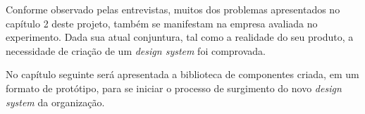 Conforme observado pelas entrevistas, muitos dos problemas apresentados no capítulo 2 deste projeto, também se manifestam na empresa avaliada no experimento. Dada sua atual conjuntura, tal como a realidade do seu produto, a necessidade de criação de um \textit{design system} foi comprovada.

No capítulo seguinte será apresentada a biblioteca de componentes criada, em um formato de protótipo, para se iniciar o processo de surgimento do novo \textit{design system} da organização.
